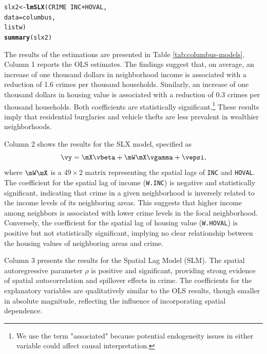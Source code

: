 \documentclass[english,12pt]{book}\usepackage[]{graphicx}\usepackage[]{xcolor}
\makeatletter
\newcommand{\hlopt}[1]{\textcolor[rgb]{0,0,0}{#1}}%
\newcommand{\hldef}[1]{\textcolor[rgb]{0.345,0.345,0.345}{#1}}%
\newcommand{\hlkwb}[1]{\textcolor[rgb]{0.69,0.353,0.396}{#1}}%
\newcommand{\hlkwc}[1]{\textcolor[rgb]{0.333,0.667,0.333}{#1}}%
\newcommand{\hlkwd}[1]{\textcolor[rgb]{0.737,0.353,0.396}{\textbf{#1}}}%
\newenvironment{kframe}{%
 \def\at@end@of@kframe{}%
 \ifinner\ifhmode%
  \def\at@end@of@kframe{\end{minipage}}%
  \begin{minipage}{\columnwidth}%
 \fi\fi%
 \def\FrameCommand##1{\hskip\@totalleftmargin \hskip-\fboxsep
 \colorbox{shadecolor}{##1}\hskip-\fboxsep
     \hskip-\linewidth \hskip-\@totalleftmargin \hskip\columnwidth}%
 \MakeFramed {\advance\hsize-\width
   \@totalleftmargin\z@ \linewidth\hsize
   \@setminipage}}%
 {\par\unskip\endMakeFramed%
 \at@end@of@kframe}
\newenvironment{knitrout}{}{} %
\makeatother
\begin{document}
\begin{knitrout}
\color{fgcolor}\begin{kframe}
\begin{alltt}
\hldef{slx2} \hlkwb{<-} \hlkwd{lmSLX}\hldef{(CRIME} \hlopt{~} \hldef{INC} \hlopt{+} \hldef{HOVAL,}
              \hlkwc{data} \hldef{= columbus,}
              \hldef{listw)}
\hlkwd{summary}\hldef{(slx2)}
\end{alltt}
\end{kframe}
\end{knitrout}


The results of the estimations are presented in Table \ref{tab:columbus-models}. Column 1 reports the OLS estimates. The findings suggest that, on average, an increase of one thousand dollars in neighborhood income is associated with a reduction of 1.6 crimes per thousand households. Similarly, an increase of one thousand dollars in housing value is associated with a reduction of 0.3 crimes per thousand households. Both coefficients are statistically significant.\footnote{We use the term "associated" because potential endogeneity issues in either variable could affect causal interpretation.} These results imply that residential burglaries and vehicle thefts are less prevalent in wealthier neighborhoods.

Column 2 shows the results for the SLX model, specified as 
\[
\vy = \mX\vbeta + \mW\mX\vgamma + \vepsi,
\]
where \(\mW\mX\) is a \(49 \times 2\) matrix representing the spatial lags of \texttt{INC} and \texttt{HOVAL}. The coefficient for the spatial lag of income (\texttt{W.INC}) is negative and statistically significant, indicating that crime in a given neighborhood is inversely related to the income levels of its neighboring areas. This suggests that higher income among neighbors is associated with lower crime levels in the focal neighborhood. Conversely, the coefficient for the spatial lag of housing value (\texttt{W.HOVAL}) is positive but not statistically significant, implying no clear relationship between the housing values of neighboring areas and crime.

Column 3 presents the results for the Spatial Lag Model (SLM). The spatial autoregressive parameter \(\rho\) is positive and significant, providing strong evidence of spatial autocorrelation and spillover effects in crime. The coefficients for the explanatory variables are qualitatively similar to the OLS results, though smaller in absolute magnitude, reflecting the influence of incorporating spatial dependence.
\end{document}
